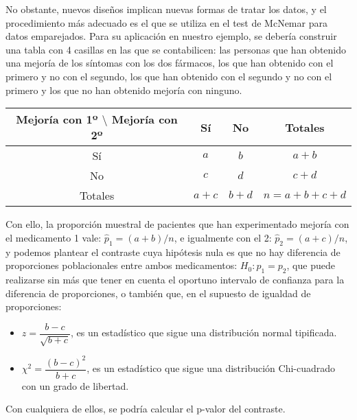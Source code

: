 No obstante, nuevos diseños implican nuevas formas de tratar los datos, y el procedimiento más adecuado es el que se utiliza en el test de
McNemar para datos emparejados. Para su aplicación en nuestro ejemplo, se debería construir una tabla con 4 casillas en las que se
contabilicen: las personas que han obtenido una mejoría de los síntomas con los dos fármacos, los que han obtenido con el primero y no con
el segundo, los que han obtenido con el segundo y no con el primero y los que no han obtenido mejoría con ninguno.

\begin{center}
\begin{tabular}{|l|l|l|l|}
\hline
\multicolumn{1}{|c|}{Mejoría con 1º $\setminus$ Mejoría con 2º} & \multicolumn{1}{c|}{Sí} & \multicolumn{1}{c|}{No} & \multicolumn{1}{c|}{Totales } \\
\hline
\multicolumn{1}{|c|}{Sí} & \multicolumn{1}{c|}{$a$} & \multicolumn{1}{c|}{$b$} & \multicolumn{1}{c|}{$a+b$} \\
\hline
\multicolumn{1}{|c|}{No} & \multicolumn{1}{c|}{$c$} & \multicolumn{1}{c|}{$d$} & \multicolumn{1}{c|}{$c+d$} \\
\hline
\multicolumn{1}{|c|}{Totales} & \multicolumn{1}{c|}{$a+c$} & \multicolumn{1}{c|}{$b+d$} & \multicolumn{1}{c|}{$n=a+b+c+d$} \\
\hline
\end{tabular}
\end{center}

Con ello, la proporción muestral de pacientes que han experimentado mejoría con el medicamento 1 vale: $\widehat{p}_1=(a+b)/n$, e igualmente
con el 2: $\widehat{p}_2=(a+c)/n$, y podemos plantear el contraste cuya hipótesis nula es que no hay diferencia de proporciones
poblacionales entre ambos medicamentos: $H_0: p_1=p_2$, que puede realizarse sin más que tener en cuenta el oportuno intervalo de confianza
para la diferencia de proporciones, o también que, en el supuesto de igualdad de proporciones:

\begin{itemize}
\item $z = \dfrac{{b - c}}{{\sqrt {b + c} }}$, es un estadístico que sigue una distribución normal tipificada.
\item $\chi ^2  = \dfrac{{\left( {b - c} \right)^2 }}{{b + c}}$, es un estadístico que sigue una distribución Chi-cuadrado con un grado de
libertad.
\end{itemize}

Con cualquiera de ellos, se podría calcular el p-valor del contraste.

